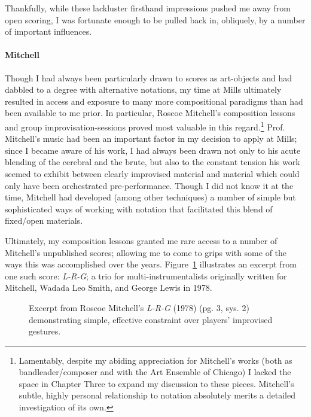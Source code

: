     Thankfully, while these lackluster firsthand impressions pushed me away from open scoring, I was fortunate enough to be pulled back in, obliquely, by a number of important influences. 

    \paragraph{Mitchell}
    Though I had always been particularly drawn to scores as art-objects and had dabbled to a degree with alternative notations, my time at Mills ultimately resulted in access and exposure to many more compositional paradigms than had been available to me prior. In particular, Roscoe Mitchell's composition lessons and group improvisation-sessions proved most valuable in this regard.\footnote{Lamentably, despite my abiding appreciation for Mitchell's works (both as bandleader/composer and with the Art Ensemble of Chicago) I lacked the space in Chapter Three to expand my discussion to these pieces. Mitchell's subtle, highly personal relationship to notation absolutely merits a detailed investigation of its own.} Prof. Mitchell's music had been an important factor in my decision to apply at Mills; since I became aware of his work, I had always been drawn not only to his acute blending of the cerebral and the brute, but also to the constant tension his work seemed to exhibit between clearly improvised material and material which could only have been orchestrated pre-performance. Though I did not know it at the time, Mitchell had developed (among other techniques) a number of simple but sophisticated ways of working with notation that facilitated this blend of fixed/open materials.
    
    Ultimately, my composition lessons granted me rare access to a number of Mitchell's unpublished scores; allowing me to come to grips with some of the ways this was accomplished over the years. Figure~\ref{fig:LRGexcerpt} illustrates an excerpt from one such score: \textit{L-R-G}; a trio for multi-instrumentalists originally written for Mitchell, Wadada Leo Smith, and George Lewis in 1978.  

    \begin{figure}
        \centering
        \captionsetup{width=.5\textwidth}
        \caption{Excerpt from Roscoe Mitchell's \textit{L-R-G} (1978) (pg. 3, sys. 2) demonstrating simple, effective constraint over players' improvised gestures.}
        \label{fig:LRGexcerpt}
    \end{figure}

